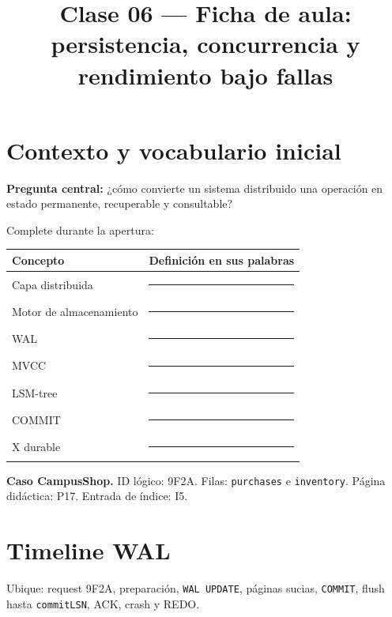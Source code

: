 \documentclass[variant=guia,cover=institutional,mode=print]{ua-engineering-v6-article}
\title{Clase 06 --- Ficha de aula: persistencia, concurrencia y rendimiento bajo fallas}
\author{\UAProfessor}
\date{\UADate}
\begin{document}
\setlength{\emergencystretch}{2em}
\maketitle

\section{Contexto y vocabulario inicial}

\textbf{Pregunta central:} ¿cómo convierte un sistema distribuido una operación en estado permanente, recuperable y consultable?

Complete durante la apertura:

\begin{center}
\begin{tabular}{p{}p{}}
\toprule
Concepto & Definición en sus palabras \\
\midrule
Capa distribuida & \rule{0.58\textwidth}{0.4pt} \\[0.45cm]
Motor de almacenamiento & \rule{0.58\textwidth}{0.4pt} \\[0.45cm]
WAL & \rule{0.58\textwidth}{0.4pt} \\[0.45cm]
MVCC & \rule{0.58\textwidth}{0.4pt} \\[0.45cm]
LSM-tree & \rule{0.58\textwidth}{0.4pt} \\[0.45cm]
COMMIT & \rule{0.58\textwidth}{0.4pt} \\[0.45cm]
X durable & \rule{0.58\textwidth}{0.4pt} \\[0.45cm]
\bottomrule
\end{tabular}
\end{center}

\begin{uainfo}
\textbf{Caso CampusShop.} ID lógico: 9F2A. Filas: \texttt{purchases} e \texttt{inventory}. Página didáctica: P17. Entrada de índice: I5.
\end{uainfo}

\newpage
\section{Timeline WAL}

Ubique: request 9F2A, preparación, \texttt{WAL UPDATE}, páginas sucias, \texttt{COMMIT}, flush hasta \texttt{commitLSN}, ACK, crash y REDO.

\begin{center}
\end{center}
\end{document}
